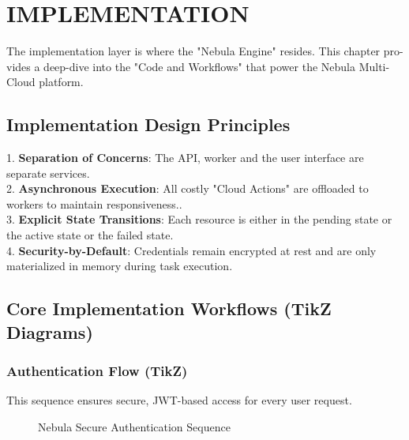 \chapter{IMPLEMENTATION}

The implementation layer is where the "Nebula Engine" resides. This chapter pro- vides a deep-dive into the "Code and Workflows" that power the Nebula Multi-Cloud platform.

\section{Implementation Design Principles}
1. \textbf{Separation of Concerns}:  The API, worker and the user interface are separate services. \\
2. \textbf{Asynchronous Execution}: All costly "Cloud Actions" are offloaded to workers to maintain responsiveness.. \\
3. \textbf{Explicit State Transitions}: Each resource is either in the pending state or the active state or the failed state. \\
4. \textbf{Security-by-Default}: Credentials remain encrypted at rest and are only materialized in memory during task execution.

\section{Core Implementation Workflows (TikZ Diagrams)}

\subsection{Authentication Flow (TikZ)}
This sequence ensures secure, JWT-based access for every user request.

\begin{figure}[h]
\centering
{}
\caption{Nebula Secure Authentication Sequence}
\label{fig:auth_flow}
\end{figure}

